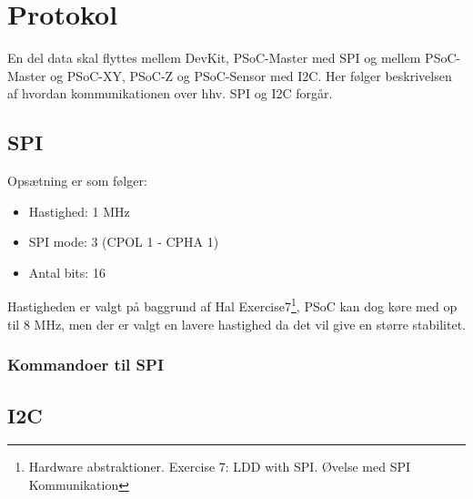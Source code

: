\section{Protokol}

En del data skal flyttes mellem DevKit, PSoC-Master med SPI og mellem PSoC-Master og PSoC-XY, PSoC-Z og PSoC-Sensor med I2C. Her følger beskrivelsen af hvordan kommunikationen over hhv. SPI og I2C forgår.

\subsection{SPI}

Opsætning er som følger:
\begin{itemize}
    \item Hastighed: 1 MHz
    \item SPI mode: 3 (CPOL 1 - CPHA 1)
    \item Antal bits: 16
\end{itemize}

Hastigheden er valgt på baggrund af Hal Exercise7\footnote{Hardware abstraktioner. Exercise 7: LDD with SPI. Øvelse med SPI Kommunikation}, PSoC kan dog køre med op til 8 MHz, men der er valgt en lavere hastighed da det vil give en større stabilitet.

\subsubsection{Kommandoer til SPI}

\subsection{I2C}

